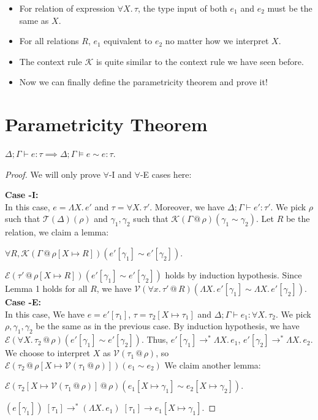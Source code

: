 \documentclass{lecturenotes}
\makeatletter
\newcommand{\fatype}[2]{\ensuremath{\forall #1.\,#2}}
\newcommand{\Abs}[2]{\Lambda #1.\,#2}
\newcommand{\App}[2]{#1\;[#2]}
\newcommand{\at}{\ensuremath{\mathrel{@}}}
\newcommand{\binval}[4]{\ensuremath{\mathcal{V}(#1 \at #2)(#3 \sim #4)}}
\newcommand{\binexpr}[4]{\ensuremath{\mathcal{E}(#1 \at #2)(#3 \sim #4)}}
\newcommand{\bintypectxt}[2]{\ensuremath{\mathcal{T}(#1)(#2)}}
\newcommand{\binctxt}[4]{\ensuremath{\mathcal{K}(#1 \at #2)(#3 \sim #4)}}
\makeatother
\begin{document}
\begin{itemize}
    \item For relation of expression $\fatype{X}{\tau}$, the type input of both $e_1$ and $e_2$ must be the same as $X$.
    \item For all relations $R$, $e_1$ equivalent to $e_2$ no matter how we interpret $X$.
    \item The context rule $\mathcal{K}$ is quite similar to the context rule we have seen before.
    \item Now we can finally define the parametricity theorem and prove it!
\end{itemize}

\section{Parametricity Theorem}\label{thm:parametricity-theorem}
\begin{thm}
    $\Delta; \Gamma \vdash e : \tau \implies \Delta; \Gamma \vDash  e \sim e : \tau$.
\end{thm}
\begin{proof}
    We will only prove $\forall$-I and $\forall$-E cases here:

    \noindent\textbf{Case \forall-I:}\\
    In this case, $e = \Abs{X}{e'}$ and $\tau = \fatype{X}{\tau'}$.
    Moreover, we have $\Delta; \Gamma \vdash e' : \tau'$. We pick $\rho$ such that $\bintypectxt{\Delta}{\rho}$
    and $\gamma_1, \gamma_2$ such that $\binctxt{\Gamma}{\rho}{\gamma_1}{\gamma_2}$. Let $R$ be the relation, we claim a lemma:
    \begin{lem}
        $\forall R, \binctxt{\Gamma}{\rho[X \mapsto R]}{e'[\gamma_1]}{e'[\gamma_2]}$.
    \end{lem}
    \noindent$\binexpr{\tau'}{\rho[X \mapsto R]}{e'[\gamma_1]}{e'[\gamma_2]}$ holds by induction hypothesis.
    Since Lemma 1 holds for all $R$, we have $\binval{\fatype{x}{\tau'}}{R}{\Abs{X}{e'[\gamma_1]}}{\Abs{X}{e'[\gamma_2]}}$.\\

    \noindent\textbf{Case \forall-E:}\\
    In this case, We have $e = e'[\tau_1]$, $\tau = \tau_2[X \mapsto \tau_1]$ and $\Delta; \Gamma \vdash e_1 : \fatype{X}{\tau_2}$.
    We pick $\rho, \gamma_1, \gamma_2$ be the same as in the previous case. By induction hypothesis, we have
    $\binexpr{\fatype{X}{\tau_2}}{\rho}{e'[\gamma_1]}{e'[\gamma_2]}$. Thus, $e'[\gamma_1] \to^\ast \Abs{X}{e_1}$, $e'[\gamma_2] \to^\ast \Abs{X}{e_2}$.
    We choose to interpret $X$ as $\mathcal{V}(\tau_1 \at \rho)$, so $\binexpr{\tau_2}{\rho[X \mapsto \mathcal{V}(\tau_1 \at \rho)]}{e_1}{e_2}$
    We claim another lemma:
    \begin{lem}
        $\binexpr{\tau_2[X \mapsto \mathcal{V}(\tau_1 \at \rho)]}{\rho}{e_1[X \mapsto \gamma_1]}{e_2[X \mapsto \gamma_2]}$.
    \end{lem}
    \noindent$\App{(e[\gamma_1])}{\tau_1} \to^\ast \App{(\Abs{X}{e_1})}{\tau_1} \to e_1[X \mapsto \gamma_1]$.
\end{proof}
\end{document}
